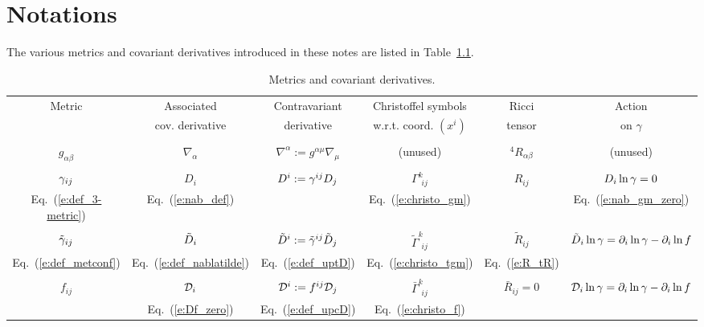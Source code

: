 %
%
\appendix

\chapter{Notations}

The various metrics and covariant derivatives introduced in these
notes are listed in 
Table~\ref{t:metrics}.
\begin{table}
\begin{tabular}{cccccc}
\hline
 Metric & Associated & Contravariant &Christoffel symbols	       & Ricci   &  Action  \\
 & cov. derivative    &  derivative & w.r.t. coord. $(x^i)$    & tensor  &  on $\gamma$ \\
\hline 
\hline \\
$g_{\alpha\beta}$ & $\nabla_\alpha$ & $\nabla^\alpha:= g^{\alpha\mu} \nabla_\mu$
& (unused)  &  ${}^4\! R_{\alpha\beta}$ & (unused) \\
\hline \\
$\gamma_{ij}$  & $D_i$ & $D^i:=\gamma^{ij} D_j$ & $\Gamma^k_{\ \, ij}$& $R_{ij}$ 
	& $D_i\ln\gamma =0$ \\
\footnotesize Eq.~(\ref{e:def_3-metric})   &  
\footnotesize Eq.~(\ref{e:nab_def}) & &
\footnotesize Eq.~(\ref{e:christo_gm}) &  
& \footnotesize  Eq.~(\ref{e:nab_gm_zero})  \\
\hline \\
 $\tilde\gamma_{ij}$  & $\tilde D_i$ & $\tilde D^i := \tilde\gamma^{ij} \tilde D_j$ & 
 $\tilde\Gamma^k_{\ \, ij}$& $\tilde R_{ij}$ 
	& $\tilde D_i\ln\gamma = \partial_i \ln\gamma - \partial_i\ln f$ \\
\footnotesize Eq.~(\ref{e:def_metconf}) &
\footnotesize Eq.~(\ref{e:def_nablatilde}) & 
\footnotesize Eq.~(\ref{e:def_uptD}) &
\footnotesize Eq.~(\ref{e:christo_tgm}) & 
\footnotesize Eq.~(\ref{e:R_tR}) & 
\footnotesize \\
\hline \\
 $f_{ij}$  &  ${\cal D}_i$ & ${\cal D}^i := f^{ij} {\cal D}_j$ 
 & $\bar\Gamma^k_{\ \, ij}$& $\bar R_{ij} = 0$ 
	& ${\cal D}_i\ln\gamma = \partial_i \ln\gamma - \partial_i\ln f$ \\
& \footnotesize Eq.~(\ref{e:Df_zero}) &
 \footnotesize Eq.~(\ref{e:def_upcD}) &
\footnotesize Eq.~(\ref{e:christo_f}) & 
& \footnotesize  \\
\hline
\end{tabular}
\caption{\label{t:metrics} Metrics and covariant derivatives.}
\end{table}
